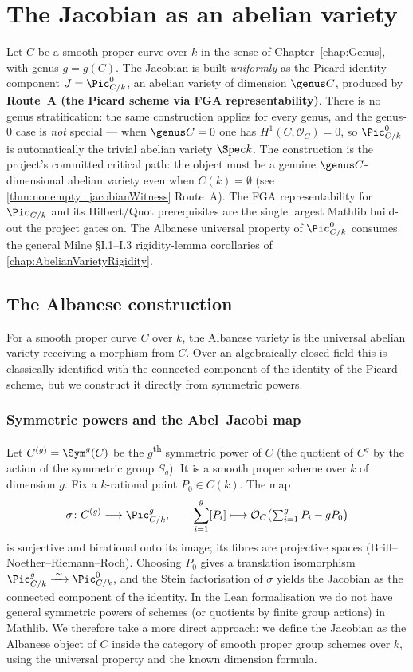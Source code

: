 \chapter{The Jacobian as an abelian variety}
\label{chap:Jacobian}
Let \(C\) be a smooth proper curve over \(k\) in the sense of Chapter~\ref{chap:Genus}, with genus \(g = g(C)\).
The Jacobian is built \emph{uniformly} as the Picard identity component \(J = \Pic^0_{C/k}\), an abelian variety of dimension \(\genus C\), produced by \textbf{Route~A (the Picard scheme via FGA representability)}. There is no genus stratification: the same construction applies for every genus, and the genus-\(0\) case is \emph{not} special --- when \(\genus C = 0\) one has \(H^1(C, \mathcal O_C) = 0\), so \(\Pic^0_{C/k}\) is automatically the trivial abelian variety \(\Spec k\). The construction is the project's committed critical path: the object must be a genuine \(\genus C\)-dimensional abelian variety even when \(C(k) = \emptyset\) (see \cref{thm:nonempty_jacobianWitness} Route~A). The FGA representability for \(\Pic_{C/k}\) and its Hilbert/Quot prerequisites are the single largest Mathlib build-out the project gates on. The Albanese universal property of \(\Pic^0_{C/k}\) consumes the general Milne \S I.1--I.3 rigidity-lemma corollaries of \cref{chap:AbelianVarietyRigidity}.
\section{The Albanese construction}
For a smooth proper curve \(C\) over \(k\), the Albanese variety is the universal abelian variety receiving a morphism from \(C\). Over an algebraically closed field this is classically identified with the connected component of the identity of the Picard scheme, but we construct it directly from symmetric powers.
\subsection{Symmetric powers and the Abel--Jacobi map}
Let \(C^{(g)} = \Sym^g(C)\) be the \(g\)\textsuperscript{th} symmetric power of \(C\) (the quotient of \(C^g\) by the action of the symmetric group \(S_g\)). It is a smooth proper scheme over \(k\) of dimension \(g\). Fix a \(k\)-rational point \(P_0 \in C(k)\). The map
\[
  \sigma \colon C^{(g)} \longrightarrow \Pic^g_{C/k}, \qquad
  \sum_{i=1}^g [P_i] \longmapsto \mathcal O_C\bigl(\textstyle\sum_{i=1}^g P_i - g P_0\bigr)
\]
is surjective and birational onto its image; its fibres are projective spaces (Brill--Noether--Riemann--Roch). Choosing \(P_0\) gives a translation isomorphism \(\Pic^g_{C/k} \xrightarrow{\;\sim\;} \Pic^0_{C/k}\), and the Stein factorisation of \(\sigma\) yields the Jacobian as the connected component of the identity.
In the Lean formalisation we do not have general symmetric powers of schemes (or quotients by finite group actions) in Mathlib. We therefore take a more direct approach: we define the Jacobian as the Albanese object of \(C\) inside the category of smooth proper group schemes over \(k\), using the universal property and the known dimension formula.
